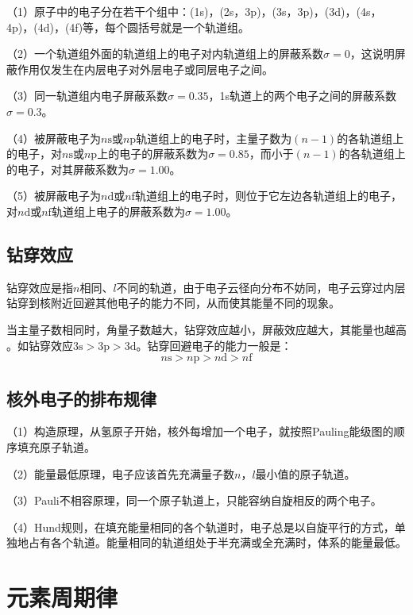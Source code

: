 \documentclass[
  10pt,
  twoside,
  openany,
  b5paper, %
  colorscheme = basic, %
]{qyxf-book}
\begin{document}
（1）原子中的电子分在若干个组中：(1s)，(2s，3p)，(3s，3p)，(3d)，(4s，4p)，(4d)，(4f)等，每个圆括号就是一个轨道组。

（2）一个轨道组外面的轨道组上的电子对内轨道组上的屏蔽系数$\sigma=0$，这说明屏蔽作用仅发生在内层电子对外层电子或同层电子之间。

（3）同一轨道组内电子屏蔽系数$\sigma = 0.35$，1s轨道上的两个电子之间的屏蔽系数$\sigma=0.3$。

（4）被屏蔽电子为$n\mathrm{s}$或$n\mathrm{p}$轨道组上的电子时，主量子数为$(n-1)$的各轨道组上的电子，对$n\mathrm{s}$或$n\mathrm{p}$上的电子的屏蔽系数为$\sigma=0.85$，而小于$(n-1)$的各轨道组上的电子，对其屏蔽系数为$\sigma=1.00$。

（5）被屏蔽电子为$n\mathrm{d}$或$n\mathrm{f}$轨道组上的电子时，则位于它左边各轨道组上的电子，对$n\mathrm{d}$或$n\mathrm{f}$轨道组上电子的屏蔽系数为$\sigma=1.00$。

\subsection{钻穿效应}
钻穿效应是指$n$相同、$l$不同的轨道，由于电子云径向分布不妨同，电子云穿过内层钻穿到核附近回避其他电子的能力不同，从而使其能量不同的现象。

当主量子数相同时，角量子数越大，钻穿效应越小，屏蔽效应越大，其能量也越高 。如钻穿效应$\mathrm{3s}>\mathrm{3p}>\mathrm{3d}$。钻穿回避电子的能力一般是：
\begin{equation*}
	n\mathrm{s} > n\mathrm{p} > n\mathrm{d} > n\mathrm{f}
\end{equation*}


\subsection{核外电子的排布规律}

（1）构造原理，从氢原子开始，核外每增加一个电子，就按照Pauling能级图的顺序填充原子轨道。

（2）能量最低原理，电子应该首先充满量子数$n$，$l$最小值的原子轨道。

（3）Pauli不相容原理，同一个原子轨道上，只能容纳自旋相反的两个电子。

（4）Hund规则，在填充能量相同的各个轨道时，电子总是以自旋平行的方式，单独地占有各个轨道。能量相同的轨道组处于半充满或全充满时，体系的能量最低。

\section{元素周期律}
\end{document}
